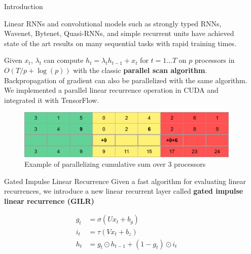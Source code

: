 \documentclass[final]{beamer}
\newlength{\sepwid}
\newlength{\onecolwid}
\begin{document}
\begin{frame}[t]
\begin{columns}[t]
\begin{column}{\onecolwid}
\begin{block}{Introduction}
\vspace{1ex}

Linear RNNs and convolutional models such as strongly typed RNNs, Wavenet, Bytenet,
Quasi-RNNs, and simple recurrent units
have achieved state of the art results on many sequential tasks with rapid training times.

\vspace{1ex}

Given $x_t$, $\lambda_t$ can compute $h_t=\lambda_t h_{t-1} + x_t$ for $t=1\ldots T$ on $p$
processors in $O(T/p + \log(p))$ with the classic \textbf{parallel scan algorithm}. Backpropagation
of gradient can also be parallelized with the same algorithm. We implemented a parallel linear
recurrence operation in CUDA and integrated it with TensorFlow.
\end{block}


\begin{figure}
\includegraphics[width=1.0\linewidth]{cumsum.png}
\caption{Example of parallelizing cumulative sum over 3 processors}
\end{figure}


\begin{block}{Gated Impulse Linear Recurrence}
Given a fast algorithm for evaluating linear recurrences, we introduce a new
linear recurrent layer called \textbf{gated impulse linear recurrence (GILR)}

\begin{align*}
g_t &= \sigma(Ux_t + b_g) \\
i_t &= \tau(Vx_t + b_z) \\
h_t &= g_t \odot h_{t-1} + (1-g_t)\odot i_t
\end{align*}
\end{block}


\end{column} %

\begin{column}{\sepwid}\end{column} %


\end{columns}
\end{frame}
\end{document}
